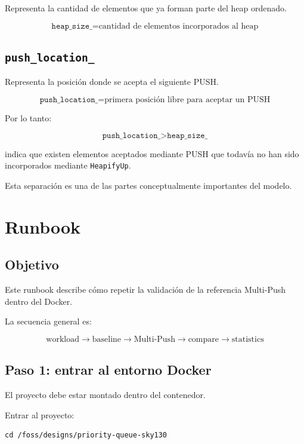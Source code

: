 \documentclass[11pt,a4paper]{article}
\begin{document}
Representa la cantidad de elementos que ya forman parte del heap
ordenado.

\[
\texttt{heap\_size\_}
=
\text{cantidad de elementos incorporados al heap}
\]

\subsection{\texttt{push\_location\_}}

Representa la posición donde se acepta el siguiente PUSH.

\[
\texttt{push\_location\_}
=
\text{primera posición libre para aceptar un PUSH}
\]

Por lo tanto:

\[
\boxed{
\texttt{push\_location\_} > \texttt{heap\_size\_}
}
\]

indica que existen elementos aceptados mediante PUSH que todavía no han
sido incorporados mediante \texttt{HeapifyUp}.

Esta separación es una de las partes conceptualmente importantes del
modelo.

\section{Runbook}

\subsection{Objetivo}

Este runbook describe cómo repetir la validación de la referencia
Multi-Push dentro del Docker.

La secuencia general es:

\[
\boxed{
\text{workload}
\rightarrow
\text{baseline}
\rightarrow
\text{Multi-Push}
\rightarrow
\text{compare}
\rightarrow
\text{statistics}
}
\]

\subsection{Paso 1: entrar al entorno Docker}

El proyecto debe estar montado dentro del contenedor.

Entrar al proyecto:

\begin{lstlisting}[style=terminal]
cd /foss/designs/priority-queue-sky130
\end{lstlisting}
\end{document}
